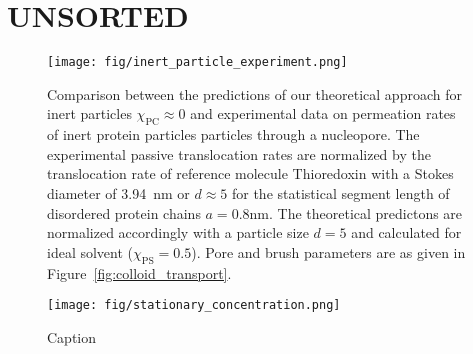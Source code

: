 \section{UNSORTED}
\begin{figure}
    \centering
    \texttt{[image: fig/inert\_particle\_experiment.png]}
    \caption{
    Comparison between the predictions of our theoretical approach for inert particles $\chi_{\text{PC}} \approx 0$ and experimental data \cite{Mohr2009} on permeation rates of inert protein particles particles through a nucleopore.
    The experimental passive translocation rates are normalized by the translocation rate of reference molecule Thioredoxin with a Stokes diameter of 3.94~nm or $d\approx 5$ for the statistical segment length of disordered protein chains $a=0.8 \text{nm}$.
    The theoretical predictons are normalized accordingly with a particle size $d=5$ and calculated for ideal solvent ($\chi_{\text{PS}}=0.5$).
    Pore and brush parameters are as given in Figure~\ref{fig:colloid_transport}. 
    }
    \label{fig:inert_colloid}
\end{figure}

\begin{figure}
    \centering
    \texttt{[image: fig/stationary\_concentration.png]}
    \caption{
    Caption    
    }
    \label{fig:stationary_concentration}
\end{figure}

\pagebreak